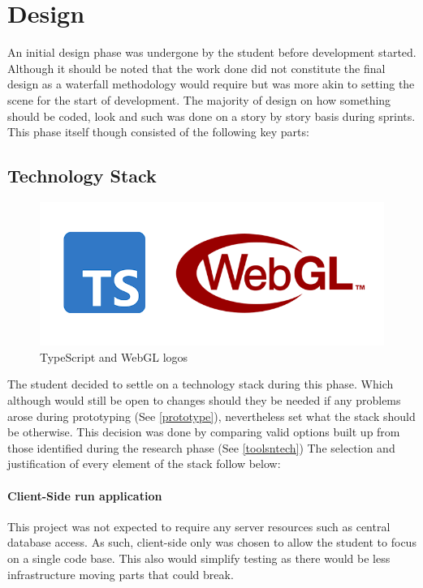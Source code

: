 \section{Design}
An initial design phase was undergone by the student before development started. Although it should be noted that the work done did not constitute the final design as a waterfall methodology would require but was more akin to setting the scene for the start of development. The majority of design on how something should be coded, look and such was done on a story by story basis during sprints.
This phase itself though consisted of the following key parts:

\subsection{Technology Stack} \label{techstack}
\begin{figure}[h]
    \centering
    \includegraphics[width=1\columnwidth]{author-files/figures/logo-ts-webgl.PNG}
    \caption{TypeScript and WebGL logos}
    \label{fig:tswebgllogo}
\end{figure}
The student decided to settle on a technology stack during this phase. Which although would still be open to changes should they be needed if any problems arose during prototyping (See \ref{prototype}), nevertheless set what the stack should be otherwise. This decision was done by comparing valid options built up from those identified during the research phase (See \ref{toolsntech}) The selection and justification of every element of the stack follow below:

\paragraph{Client-Side run application}
This project was not expected to require any server resources such as central database access. As such, client-side only was chosen to allow the student to focus on a single code base. This also would simplify testing as there would be less infrastructure moving parts that could break.

